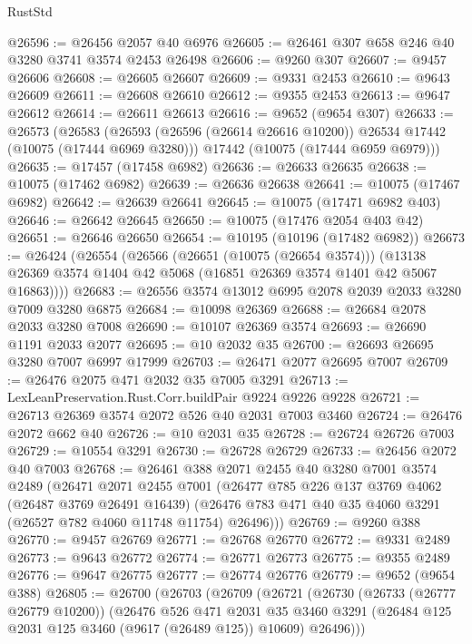 \begin{lexlean}{RustStd}
\begin{coremodule}
@26596 := @26456 @2057 @40 @6976
@26605 := @26461 @307 @658 @246 @40 @3280 @3741 @3574 @2453 @26498
@26606 := @9260 @307
@26607 := @9457 @26606
@26608 := @26605 @26607
@26609 := @9331 @2453
@26610 := @9643 @26609
@26611 := @26608 @26610
@26612 := @9355 @2453
@26613 := @9647 @26612
@26614 := @26611 @26613
@26616 := @9652 (@9654 @307)
@26633 := @26573
    (@26583
      (@26593 (@26596 (@26614 @26616 @10200)) @26534 @17442 (@10075 (@17444 @6969 @3280)))
      @17442
      (@10075 (@17444 @6959 @6979)))
@26635 := @17457 (@17458 @6982)
@26636 := @26633 @26635
@26638 := @10075 (@17462 @6982)
@26639 := @26636 @26638
@26641 := @10075 (@17467 @6982)
@26642 := @26639 @26641
@26645 := @10075 (@17471 @6982 @403)
@26646 := @26642 @26645
@26650 := @10075 (@17476 @2054 @403 @42)
@26651 := @26646 @26650
@26654 := @10195 (@10196 (@17482 @6982))
@26673 := @26424
    (@26554
      (@26566
        (@26651 (@10075 (@26654 @3574)))
        (@13138 @26369 @3574 @1404 @42 @5068 (@16851 @26369 @3574 @1401 @42 @5067 @16863))))
@26683 := @26556 @3574 @13012 @6995 @2078 @2039 @2033 @3280 @7009 @3280 @6875
@26684 := @10098 @26369
@26688 := @26684 @2078 @2033 @3280 @7008
@26690 := @10107 @26369 @3574
@26693 := @26690 @1191 @2033 @2077
@26695 := @10 @2032 @35
@26700 := @26693 @26695 @3280 @7007 @6997 @17999
@26703 := @26471 @2077 @26695 @7007
@26709 := @26476 @2075 @471 @2032 @35 @7005 @3291
@26713 := LexLeanPreservation.Rust.Corr.buildPair @9224 @9226 @9228
@26721 := @26713 @26369 @3574 @2072 @526 @40 @2031 @7003 @3460
@26724 := @26476 @2072 @662 @40
@26726 := @10 @2031 @35
@26728 := @26724 @26726 @7003
@26729 := @10554 @3291
@26730 := @26728 @26729
@26733 := @26456 @2072 @40 @7003
@26768 := @26461
    @388
    @2071
    @2455
    @40
    @3280
    @7001
    @3574
    @2489
    (@26471
      @2071
      @2455
      @7001
      (@26477
        @785
        @226
        @137
        @3769
        @4062
        (@26487 @3769 @26491 @16439)
        (@26476 @783 @471 @40 @35 @4060 @3291 (@26527 @782 @4060 @11748 @11754) @26496)))
@26769 := @9260 @388
@26770 := @9457 @26769
@26771 := @26768 @26770
@26772 := @9331 @2489
@26773 := @9643 @26772
@26774 := @26771 @26773
@26775 := @9355 @2489
@26776 := @9647 @26775
@26777 := @26774 @26776
@26779 := @9652 (@9654 @388)
@26805 := @26700
    (@26703
      (@26709
        (@26721
          (@26730
            (@26733 (@26777 @26779 @10200))
            (@26476
              @526
              @471
              @2031
              @35
              @3460
              @3291
              (@26484 @125 @2031 @125 @3460 (@9617 (@26489 @125)) @10609)
              @26496)))

\end{coremodule}
\end{lexlean}
